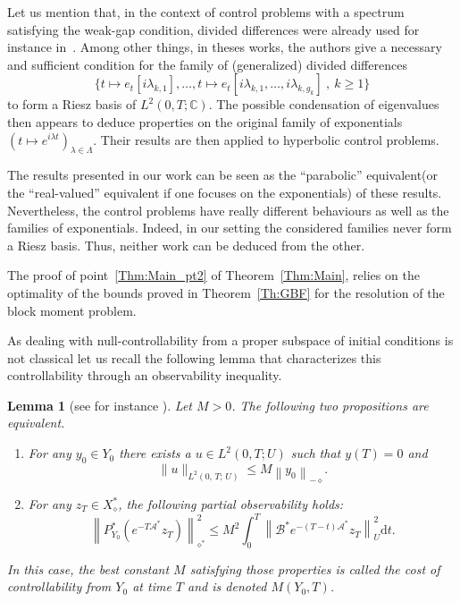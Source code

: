 \documentclass[10pt]{amsart}
\newtheorem{lemm}[theo]{Lemma}\newtheorem{prop}[theo]{Proposition}\newtheorem{coro}[theo]{Corollary}\newtheorem{conj}[theo]{Conjecture}
\theoremstyle{definition}\newtheorem{defi}[theo]{Definition}\newtheorem{rema}[theo]{Remark}\newtheorem{exam}[theo]{Example}\newtheorem{exem}[theo]{Example}\newtheorem{nota}[theo]{Notation}
\newcommand\As{\mathcal{A}^*}
\newcommand\Bs{\mathcal{B}^*}
\newcommand{\Xalphas}{X_\diamond^*}
\newcommand{\Fzp}{Y_0}
\newcommand{\normeU}[1]{\left\| #1 \right\|_U}
\newcommand{\normeXalphas}[1]{\left\| #1 \right\|_{\diamond^*}}
\newcommand{\normeXmalpha}[1]{\left\| #1 \right\|_{-\diamond}}
\newcommand{\PFa}{P_{\Fzp}^*}
\newcommand{\n}{g}
\newcommand{\C}{\mathbb{C}}
\newcommand{\md}{\mathrm{d}}
\begin{document}
Let us mention that, in the context of control problems with a spectrum satisfying the weak-gap condition, divided differences were already used for instance in~\cite{AvdoninIvanov01,BaiocchiKomornikLoreti:2002}. Among other things, in theses works, the authors give a necessary and sufficient condition for the family of (generalized) divided differences
\[
\big\{ t \mapsto e_t[i \lambda_{k,1}], \dotsc, t \mapsto e_t[i \lambda_{k,1}, \dotsc, i \lambda_{k, \n_k}] \:, \: k \geq 1 \big\}
\]
to form a Riesz basis of $L^2(0,T ; \C)$. The possible condensation of eigenvalues then appears to deduce properties on the original family of exponentials $(t\mapsto e^{i \lambda t})_{\lambda \in \Lambda}$. Their results are then applied to hyperbolic control problems.

The results presented in our work can be seen as the ``parabolic'' equivalent\linebreak(or the ``real-valued'' equivalent if one focuses on the exponentials) of these results. Nevertheless, the control problems have really different behaviours as well as the families of exponentials. Indeed, in our setting the considered families never form a Riesz basis. Thus, neither work can be deduced from the other.

The proof of point~\eqref{Thm:Main_pt2} of Theorem~\ref{Thm:Main}, relies on the optimality of the bounds proved in Theorem~\ref{Th:GBF} for the resolution of the block moment problem.

As dealing with null-controllability from a proper subspace of initial conditions is not classical let us recall the following lemma that characterizes this controllability through an observability inequality.

\begin{lemm}[see for instance {\cite[Lemma~2.1]{AB18}}]\label{Lemmme:Observabilite}
Let $M>0$.
The following two propositions are equivalent.
\begin{enumerate}
\item \label{1.13.1} For any $y_0 \in \Fzp$ there exists a $u \in L^2(0,T;U)$ such that $y(T) = 0$ and
\begin{equation*}
\| u \|_{L^2(0,\,T ;\,U)} \leq M \normeXmalpha{ y_0 }.
\end{equation*}
\item \label{1.13.2}For any $z_T \in \Xalphas$, the following partial observability holds:
\begin{equation}\label{InegObs}
\normeXalphas{ \PFa \left(e^{-T \As} z_T \right) }^2 \leq M^2 \int_0^T \normeU{ \Bs e^{-(T-t) \As} z_T }^2 \md t.
\end{equation}
\end{enumerate}
In this case, the best constant $M$ satisfying those properties is called the cost of controllability from $\Fzp$ at time $T$ and is denoted $M(\Fzp,T)$.
\end{lemm}
\end{document}
